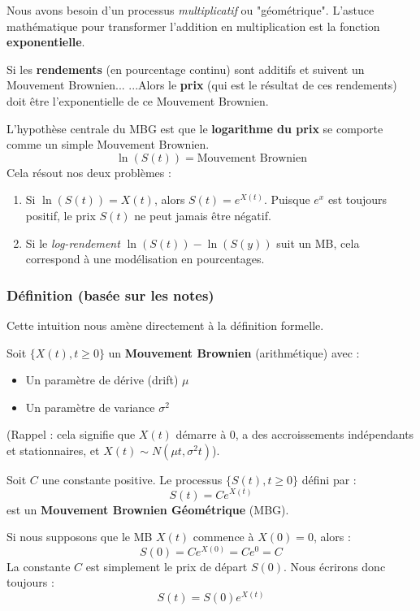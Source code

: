 Nous avons besoin d'un processus \textit{multiplicatif} ou "géométrique". L'astuce mathématique pour transformer l'addition en multiplication est la fonction \textbf{exponentielle}.

\begin{intuitionbox}
Si les \textbf{rendements} (en pourcentage continu) sont additifs et suivent un Mouvement Brownien...
...Alors le \textbf{prix} (qui est le résultat de ces rendements) doit être l'exponentielle de ce Mouvement Brownien.

L'hypothèse centrale du MBG est que le \textbf{logarithme du prix} se comporte comme un simple Mouvement Brownien.
$$ \ln(S(t)) = \text{Mouvement Brownien} $$
Cela résout nos deux problèmes :
\begin{enumerate}
    \item Si $\ln(S(t)) = X(t)$, alors $S(t) = e^{X(t)}$. Puisque $e^x$ est toujours positif, le prix $S(t)$ ne peut jamais être négatif.
    \item Si le \textit{log-rendement} $\ln(S(t)) - \ln(S(y))$ suit un MB, cela correspond à une modélisation en pourcentages.
\end{enumerate}
\end{intuitionbox}

\subsubsection{Définition (basée sur les notes)}

Cette intuition nous amène directement à la définition formelle.

\begin{definitionbox}
Soit $\{X(t), t \ge 0\}$ un \textbf{Mouvement Brownien} (arithmétique) avec :
\begin{itemize}
    \item Un paramètre de dérive (drift) $\mu$
    \item Un paramètre de variance $\sigma^2$
\end{itemize}
(Rappel : cela signifie que $X(t)$ démarre à 0, a des accroissements indépendants et stationnaires, et $X(t) \sim N(\mu t, \sigma^2 t)$).

Soit $C$ une constante positive. Le processus $\{S(t), t \ge 0\}$ défini par :
$$S(t) = C e^{X(t)}$$
est un \textbf{Mouvement Brownien Géométrique} (MBG).
\end{definitionbox}

\begin{remarquebox}
Si nous supposons que le MB $X(t)$ commence à $X(0)=0$, alors :
$$ S(0) = C e^{X(0)} = C e^0 = C $$
La constante $C$ est simplement le prix de départ $S(0)$. Nous écrirons donc toujours :
$$S(t) = S(0) e^{X(t)}$$
\end{remarquebox}

